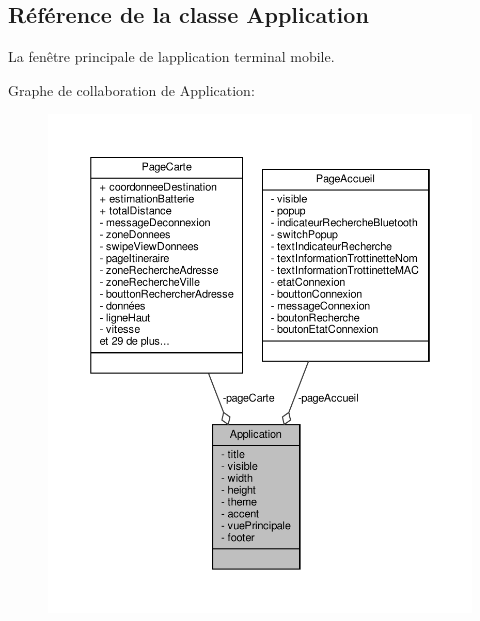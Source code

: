 \hypertarget{class_application}{}\subsection{Référence de la classe Application}
\label{class_application}


La fenêtre principale de l\textquotesingle{}application terminal mobile.  




Graphe de collaboration de Application\+:\nopagebreak
\begin{figure}[H]
\begin{center}
\leavevmode
\includegraphics[width=350pt]{class_application__coll__graph}
\end{center}
\end{figure}
